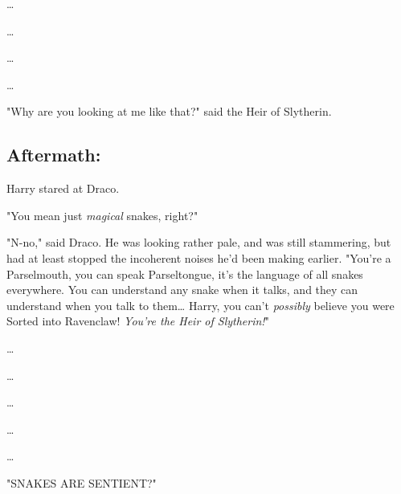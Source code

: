 {\ldots}

{\ldots}

{\ldots}

{\ldots}

"Why are you looking at me like that?" said the Heir of Slytherin.
\sbreak
\subsection{Aftermath:}

Harry stared at Draco.

"You mean just \emph{magical} snakes, right?"

"N-no," said Draco. He was looking rather pale, and was still stammering, but 
had at least stopped the incoherent noises he'd been making earlier. "You're a 
Parselmouth, you can speak Parseltongue, it's the language of all snakes 
everywhere. You can understand any snake when it talks, and they can understand 
when you talk to them{\ldots} Harry, you can't \emph{possibly} believe you were 
Sorted into Ravenclaw! \emph{You're the Heir of Slytherin!}"

{\ldots}

{\ldots}

{\ldots}

{\ldots}

{\ldots}

"SNAKES ARE SENTIENT?"
